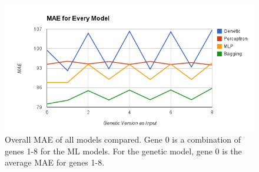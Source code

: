 \begin{figure}[center]
	\centering
	\includegraphics[width=16cm]{images/MAE_by_type.png}
	\caption{Overall MAE of all models compared. Gene 0 is a combination of genes 1-8 for the ML models. For the genetic model, gene 0 is the average MAE for genes 1-8.}
	\label{fig:mae_by_type}
\end{figure}

\clearpage
